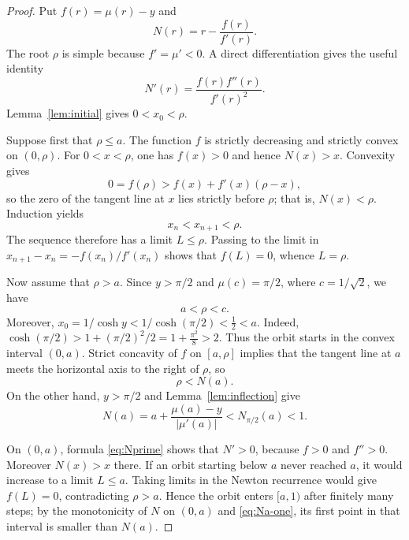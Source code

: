 \documentclass[11pt]{article}
\theoremstyle{remark}
\begin{document}
\begin{proof}
Put $f(r)=\mu(r)-y$ and
\[
 N(r)=r-\frac{f(r)}{f'(r)}.
\]
The root $\rho$ is simple because $f'=\mu'<0$.  A direct differentiation
gives the useful identity
\begin{equation}\label{eq:Nprime}
 N'(r)=\frac{f(r)f''(r)}{f'(r)^2}.
\end{equation}
Lemma~\ref{lem:initial} gives $0<x_0<\rho$.

Suppose first that $\rho\le a$.  The function $f$ is strictly decreasing and
strictly convex on $(0,\rho)$.  For $0<x<\rho$, one has $f(x)>0$ and hence
$N(x)>x$.  Convexity gives
\[
 0=f(\rho)>f(x)+f'(x)(\rho-x),
\]
so the zero of the tangent line at $x$ lies strictly before $\rho$; that is,
$N(x)<\rho$.  Induction yields
\[
 x_n<x_{n+1}<\rho.
\]
The sequence therefore has a limit $L\le\rho$.  Passing to the limit in
$x_{n+1}-x_n=-f(x_n)/f'(x_n)$ shows that $f(L)=0$, whence $L=\rho$.

Now assume that $\rho>a$.  Since $y>\pi/2$ and $\mu(c)=\pi/2$, where
$c=1/\sqrt2$, we have
\begin{equation}\label{eq:root-location}
             a<\rho<c.
\end{equation}
 Moreover,
$x_0=1/\cosh y<1/\cosh(\pi/2)<\frac12<a.$
Indeed,
$\cosh(\pi/2)
 >1+(\pi/2)^2/2
 =1+\frac{\pi^2}{8}>2.$
Thus the orbit starts in the convex interval $(0,a)$.  Strict concavity of $f$ on $[a,\rho]$ implies that the tangent line at $a$
meets the horizontal axis to the right of $\rho$, so
\begin{equation}\label{eq:Na-rho}
 \rho<N(a).
\end{equation}
On the other hand, $y>\pi/2$ and Lemma~\ref{lem:inflection} give
\begin{equation}\label{eq:Na-one}
 N(a)=a+\frac{\mu(a)-y}{|\mu'(a)|}
 <N_{\pi/2}(a)<1.
\end{equation}

On $(0,a)$, formula \eqref{eq:Nprime} shows that $N'>0$, because
$f>0$ and $f''>0$.  Moreover $N(x)>x$ there.  If an orbit starting below
$a$ never reached $a$, it would increase to a limit $L\le a$.  Taking limits
in the Newton recurrence would give $f(L)=0$, contradicting $\rho>a$.
Hence the orbit enters $[a,1)$ after finitely many steps; by the monotonicity
of $N$ on $(0,a)$ and \eqref{eq:Na-one}, its first point in that interval is
smaller than $N(a)$.


\end{proof}
\end{document}
